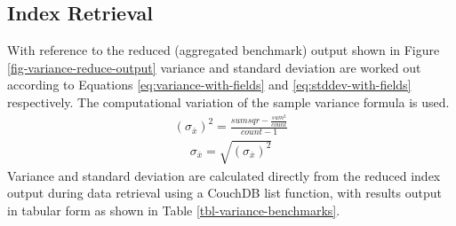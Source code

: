 \subsection{Index Retrieval}
With reference to the reduced (aggregated benchmark) output shown in Figure \ref{fig-variance-reduce-output} variance and standard deviation are worked out according to Equations \ref{eq:variance-with-fields} and \ref{eq:stddev-with-fields} respectively. The computational variation of the sample variance formula is used.
\begin{align}
  (\sigma_{\overline{x}})^{2} =  \frac{sumsqr - \frac{sum^2}{count}}{count - 1}\label{eq:variance-with-fields}
\end{align}
\begin{align}
  \sigma_{\overline{x}} = \sqrt{(\sigma_{\overline{x}})^{2}}\label{eq:stddev-with-fields}
\end{align}
Variance and standard deviation are calculated directly from the reduced index output during data retrieval using a CouchDB list function, with results output in tabular form as shown in Table \ref{tbl-variance-benchmarks}.

